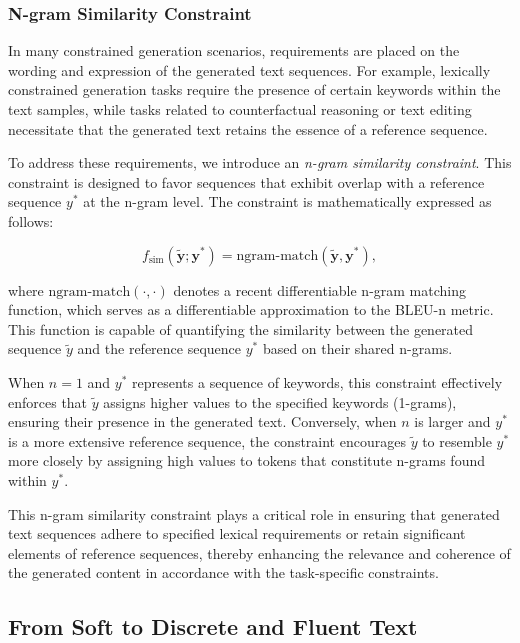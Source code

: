 \documentclass{article}
\begin{document}
\subsubsection{N-gram Similarity Constraint}

In many constrained generation scenarios, requirements are placed on the wording and expression of the generated text sequences. For example, lexically constrained generation tasks require the presence of certain keywords within the text samples, while tasks related to counterfactual reasoning or text editing necessitate that the generated text retains the essence of a reference sequence.

To address these requirements, we introduce an \emph{n-gram similarity constraint}. This constraint is designed to favor sequences that exhibit overlap with a reference sequence \(y^*\) at the n-gram level. The constraint is mathematically expressed as follows:

\begin{equation}
    f_{\text{sim}}(\tilde{\mathbf{y}}; \mathbf{y}^*) = \text{ngram-match}(\tilde{\mathbf{y}}, \mathbf{y}^*),
\end{equation}

where \(\text{ngram-match}(\cdot, \cdot)\) denotes a recent differentiable n-gram matching function, which serves as a differentiable approximation to the BLEU-n metric. This function is capable of quantifying the similarity between the generated sequence \(\tilde{y}\) and the reference sequence \(y^*\) based on their shared n-grams.

When \(n = 1\) and \(y^*\) represents a sequence of keywords, this constraint effectively enforces that \(\tilde{y}\) assigns higher values to the specified keywords (1-grams), ensuring their presence in the generated text. Conversely, when \(n\) is larger and \(y^*\) is a more extensive reference sequence, the constraint encourages \(\tilde{y}\) to resemble \(y^*\) more closely by assigning high values to tokens that constitute n-grams found within \(y^*\).

This n-gram similarity constraint plays a critical role in ensuring that generated text sequences adhere to specified lexical requirements or retain significant elements of reference sequences, thereby enhancing the relevance and coherence of the generated content in accordance with the task-specific constraints.

\subsection{From Soft to Discrete and Fluent Text}
\end{document}
